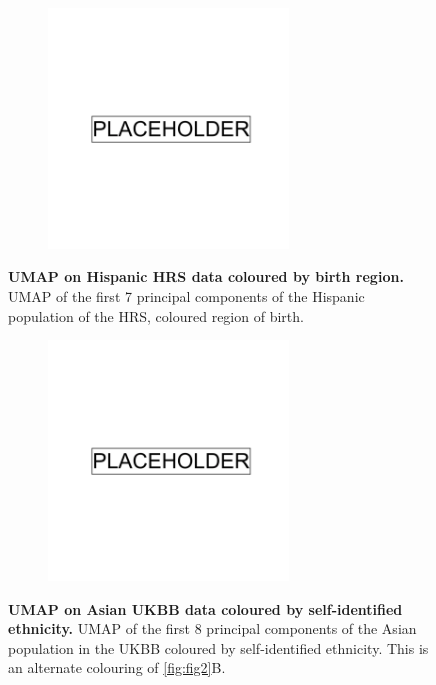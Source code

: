 \begin{figure}
    \centering
    \begin{subfigure}{\textwidth}
    \includegraphics[width=0.7\textwidth]{placeholder.png}
    \end{subfigure}
    \caption[UMAP on Hispanic HRS data coloured by birth region]{\textbf{UMAP on Hispanic HRS data coloured by birth region.} UMAP of the first 7 principal components of the Hispanic population of the HRS, coloured region of birth.}
    \label{fig:supp_umap_hrs_hisp_birth}
\end{figure}

\newpage

\begin{figure}
    \centering
    \begin{subfigure}{\textwidth}
    \includegraphics[width=0.7\textwidth]{placeholder.png}
    \end{subfigure}
    \caption[UMAP on Asian UKBB data coloured by self-identified ethnicity]{\textbf{UMAP on Asian UKBB data coloured by self-identified ethnicity.} UMAP of the first 8 principal components of the Asian population in the UKBB coloured by self-identified ethnicity. This is an alternate colouring of \ref{fig:fig2}B.}
    \label{fig:supp_umap_ukbb_asian_eth}
\end{figure}

